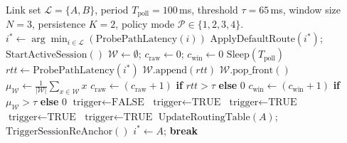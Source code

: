 \documentclass[conference]{IEEEtran}
\begin{document}
\begin{algorithm}[htbp]
\caption{\textcolor{extensioncolor}{Unified Steering Engine with $2 \times 2$ Policy Selection}}
\label{alg:steering}
\begin{algorithmic}[1]
\REQUIRE Link set $\mathcal{L} = \{A, B\}$, period $T_{\text{poll}} = 100$\,ms, threshold $\tau = 65$\,ms, window size $N = 3$, persistence $K = 2$, policy mode $\mathcal{P} \in \{1, 2, 3, 4\}$.
\STATE $i^* \leftarrow \arg\min_{i \in \mathcal{L}} (\text{ProbePathLatency}(i))$
\STATE $\text{ApplyDefaultRoute}(i^*)$; \quad $\text{StartActiveSession}()$
\STATE $\mathcal{W} \leftarrow \emptyset$; \quad $c_{\text{raw}} \leftarrow 0$; \quad $c_{\text{win}} \leftarrow 0$
    \STATE $\text{Sleep}(T_{\text{poll}})$
    \STATE $rtt \leftarrow \text{ProbePathLatency}(i^*)$
    \STATE $\mathcal{W}.\text{append}(rtt)$
        \STATE $\mathcal{W}.\text{pop\_front}()$
    \ENDIF
    \STATE $\mu_{\mathcal{W}} \leftarrow \frac{1}{|\mathcal{W}|}\sum_{x \in \mathcal{W}} x$
    \STATE $c_{\text{raw}} \leftarrow (c_{\text{raw}} + 1)$ \textbf{if} $rtt > \tau$ \textbf{else} $0$
    \STATE $c_{\text{win}} \leftarrow (c_{\text{win}} + 1)$ \textbf{if} $\mu_{\mathcal{W}} > \tau$ \textbf{else} $0$
    \STATE $\text{trigger} \leftarrow \text{FALSE}$
     \STATE $\text{trigger} \leftarrow \text{TRUE}$
     \STATE $\text{trigger} \leftarrow \text{TRUE}$
     \STATE $\text{trigger} \leftarrow \text{TRUE}$
     \STATE $\text{trigger} \leftarrow \text{TRUE}$
    \ENDIF
        \STATE $\text{UpdateRoutingTable}(A)$; \quad $\text{TriggerSessionReAnchor}()$
        \STATE $i^* \leftarrow A$; \quad \textbf{break}
    \ENDIF
\ENDWHILE
\end{algorithmic}
\end{algorithm}
\end{document}
